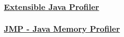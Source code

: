 

\subsubsection{\href{http://ejp.sourceforge.net/}{Extensible Java Profiler}}




\subsubsection{\href{http://www.khelekore.org/jmp/}{JMP - Java Memory Profiler}}



